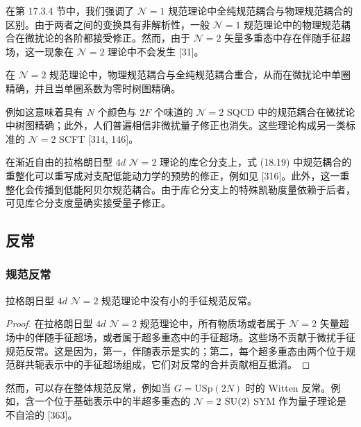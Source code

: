 在第 17.3.4 节中，我们强调了 $\mathcal N=1$ 规范理论中全纯规范耦合与物理规范耦合的区别。由于两者之间的变换具有非解析性，一般 $\mathcal N=1$ 规范理论中的物理规范耦合在微扰论的各阶都接受修正。然而，由于 $\mathcal N=2$ 矢量多重态中存在伴随手征超场，这一现象在 $\mathcal N=2$ 理论中不会发生 [31]。

\begin{proposition}[18.21]
在 $\mathcal N=2$ 规范理论中，物理规范耦合与全纯规范耦合重合，从而在微扰论中单圈精确，并且当单圈系数为零时树图精确。
\end{proposition}

例如这意味着具有 $N$ 个颜色与 $2F$ 个味道的 $\mathcal N=2$ SQCD 中的规范耦合在微扰论中树图精确；此外，人们普遍相信非微扰量子修正也消失。这些理论构成另一类标准的 $\mathcal N=2$ SCFT [314, 146]。

\begin{remark}[18.22]
在渐近自由的拉格朗日型 $4d$ $\mathcal N=2$ 理论的库仑分支上，式 (18.19) 中规范耦合的重整化可以重写成对支配低能动力学的预势的修正，例如见 [316]。此外，这一重整化会传播到低能阿贝尔规范耦合。由于库仑分支上的特殊凯勒度量依赖于后者，可见库仑分支度量确实接受量子修正。
\end{remark}

\subsection{反常}

\subsubsection*{规范反常}

\begin{proposition}[18.23]
拉格朗日型 $4d$ $\mathcal N=2$ 规范理论中没有小的手征规范反常。
\end{proposition}

\begin{proof}
在拉格朗日型 $4d$ $\mathcal N=2$ 规范理论中，所有物质场或者属于 $\mathcal N=2$ 矢量超场中的伴随手征超场，或者属于超多重态中的手征超场。这些场不贡献于微扰手征规范反常。这是因为，第一，伴随表示是实的；第二，每个超多重态由两个位于规范群共轭表示中的手征超场组成，它们对反常的合并贡献相互抵消。
\end{proof}

然而，可以存在整体规范反常，例如当 $G=\mathrm{USp}(2N)$ 时的 Witten 反常。例如，含一个位于基础表示中的半超多重态的 $\mathcal N=2$ $\operatorname{SU}(2)$ SYM 作为量子理论是不自洽的 [363]。

